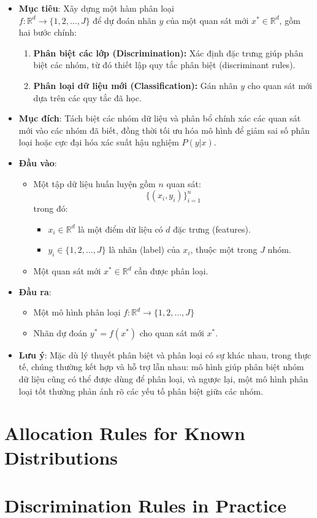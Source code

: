 \documentclass[
  a4paper,
]{article}
\providecommand{\tightlist}{%
  \setlength{\itemsep}{0pt}\setlength{\parskip}{0pt}}
\begin{document}
\begin{itemize}
\item
  \textbf{Mục tiêu}: Xây dựng một hàm phân loại\\
  \(f: \mathbb{R}^d \to \{1, 2, \dots, J\}\) để dự đoán nhãn \(y\) của
  một quan sát mới \(x^* \in \mathbb{R}^d\), gồm hai bước chính:

  \begin{enumerate}
  \def\labelenumi{\arabic{enumi}.}
  \tightlist
  \item
    \textbf{Phân biệt các lớp (Discrimination):} Xác định đặc trưng giúp
    phân biệt các nhóm, từ đó thiết lập quy tắc phân biệt (discriminant
    rules).\\
  \item
    \textbf{Phân loại dữ liệu mới (Classification):} Gán nhãn \(y\) cho
    quan sát mới dựa trên các quy tắc đã học.\\
  \end{enumerate}
\item
  \textbf{Mục đích}: Tách biệt các nhóm dữ liệu và phân bổ chính xác các
  quan sát mới vào các nhóm đã biết, đồng thời tối ưu hóa mô hình để
  giảm sai số phân loại hoặc cực đại hóa xác suất hậu nghiệm \(P(y|x)\).
\item
  \textbf{Đầu vào}:

  \begin{itemize}
  \tightlist
  \item
    Một tập dữ liệu huấn luyện gồm \(n\) quan sát:
    \[\{(x_i, y_i)\}_{i=1}^{n}\] trong đó:

    \begin{itemize}
    \tightlist
    \item
      \(x_i \in \mathbb{R}^d\) là một điểm dữ liệu có \(d\) đặc trưng
      (features).
    \item
      \(y_i \in \{1, 2, \dots, J\}\) là nhãn (label) của \(x_i\), thuộc
      một trong \(J\) nhóm.
    \end{itemize}
  \item
    Một quan sát mới \(x^* \in \mathbb{R}^d\) cần được phân loại.
  \end{itemize}
\item
  \textbf{Đầu ra}:

  \begin{itemize}
  \tightlist
  \item
    Một mô hình phân loại \(f: \mathbb{R}^d \to \{1, 2, \dots, J\}\)
  \item
    Nhãn dự đoán \(y^* = f(x^*)\) cho quan sát mới \(x^*\).
  \end{itemize}
\item
  \textbf{Lưu ý}: Mặc dù lý thuyết phân biệt và phân loại có sự khác
  nhau, trong thực tế, chúng thường kết hợp và hỗ trợ lẫn nhau: mô hình
  giúp phân biệt nhóm dữ liệu cũng có thể được dùng để phân loại, và
  ngược lại, một mô hình phân loại tốt thường phản ánh rõ các yếu tố
  phân biệt giữa các nhóm.
\end{itemize}

\section{Allocation Rules for Known
Distributions}\label{allocation-rules-for-known-distributions}

\section{Discrimination Rules in
Practice}\label{discrimination-rules-in-practice}
\end{document}
